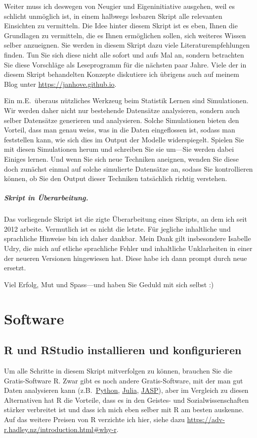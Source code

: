 \documentclass[oneside, 10pt]{book}\usepackage[]{graphicx}\usepackage[]{xcolor}
\begin{document}
Weiter muss ich deswegen von Neugier und Eigeninitiative ausgehen, weil
es schlicht unmöglich ist, in einem halbwegs lesbaren Skript alle relevanten
Einsichten zu vermitteln. Die Idee hinter diesem Skript ist es eben,
Ihnen die Grundlagen zu vermitteln, die es Ihnen ermöglichen sollen,
sich weiteres Wissen selber anzueignen. Sie werden in diesem Skript dazu
viele Literaturempfehlungen finden. Tun Sie sich diese nicht alle sofort
und aufs Mal an, sondern betrachten Sie diese Vorschläge als Leseprogramm
für die nächsten paar Jahre. Viele der in diesem Skript behandelten Konzepte
diskutiere ich übrigens auch auf meinem Blog unter 
\url{https://janhove.github.io}.

Ein m.E.\ überaus nützliches Werkzeug beim Statistik Lernen
sind Simulationen. Wir werden daher nicht nur bestehende Datensätze
analysieren, sondern auch selber Datensätze generieren und analysieren.
Solche Simulationen bieten den Vorteil, dass man genau weiss, was
in die Daten eingeflossen ist, sodass man feststellen kann, wie sich
dies im Output der Modelle widerspiegelt. Spielen Sie mit diesen
Simulationen herum und schreiben Sie sie um---Sie werden dabei Einiges lernen.
Und wenn Sie sich neue Techniken aneignen, wenden Sie diese doch 
zunächst einmal auf solche simulierte Datensätze an, sodass Sie 
kontrollieren können, ob Sie den Output dieser Techniken tatsächlich
richtig verstehen.

\paragraph{Skript in Überarbeitung.}
Das vorliegende Skript ist die zigte Überarbeitung eines Skripts,
an dem ich seit 2012 arbeite. Vermutlich ist es nicht die letzte.
Für jegliche inhaltliche und sprachliche Hinweise bin ich daher dankbar.
Mein Dank gilt insbesondere Isabelle Udry, 
die mich auf etliche sprachliche Fehler
und inhaltliche Unklarheiten in einer der neueren Versionen
hingewiesen hat. Diese habe ich dann prompt durch neue ersetzt. 

\bigskip

Viel Erfolg, Mut und Spass---und haben Sie Geduld mit sich selbst :)


\chapter{Software}\label{ch:software}

\section{R und RStudio installieren und konfigurieren}
Um alle Schritte in diesem Skript mitverfolgen zu können,
brauchen Sie die Gratis-Software R. 
Zwar gibt es noch andere Gratis-Software, mit der man gut
Daten analysieren kann (z.B.\ \href{https://www.python.org/}{Python}, 
\href{https://julialang.org/}{Julia}, \href{https://jasp-stats.org/}{JASP}), aber im Vergleich
zu diesen Alternativen hat R die Vorteile, 
dass es in den Geistes- und Sozialwissenschaften stärker verbreitet ist
und dass ich mich eben selber mit R am besten auskenne.
Auf das weitere Preisen von R verzichte ich hier, siehe dazu 
\url{https://adv-r.hadley.nz/introduction.html#why-r}.
\end{document}
